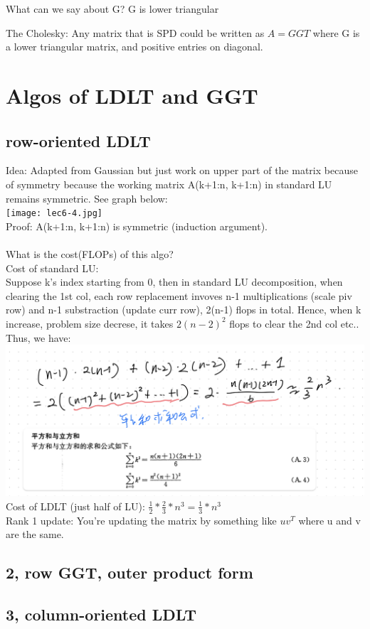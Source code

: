 \documentclass{article}
\begin{document}
\noindent
What can we say about G? G is lower triangular

\noindent
The Cholesky: Any matrix that is SPD could be written as $A = GGT$ where G is a lower triangular matrix, and positive
entries on diagonal.\\

\pagebreak
\section{Algos of LDLT and GGT}
\subsection*{row-oriented LDLT}
Idea: Adapted from Gaussian but just work on upper part of the matrix because of symmetry because
the working matrix A(k+1:n, k+1:n) in standard LU remains symmetric. See graph below:\\
\texttt{[image: lec6-4.jpg]}\\


\noindent
Proof: A(k+1:n, k+1:n) is symmetric (induction argument).\\
\\
\noindent
What is the cost(FLOPs) of this algo?\\
Cost of standard LU:\\
Suppose k's index starting from 0, then in standard LU decomposition, when clearing
the 1st col, each row replacement invoves n-1 multiplications (scale piv row) and n-1 substraction (update
curr row), 2(n-1) flops in total. Hence, when k increase, problem size decrese, it takes $2(n-2)^2$ flops
to clear the 2nd col etc.. Thus, we have:\\
\includegraphics[width=1\linewidth]{lec6-6}\\

\noindent
Cost of LDLT (just half of LU): $\frac{1}{2} * \frac{2}{3}*n^3 = \frac{1}{3}*n^3$\\


\noindent
Rank 1 update: You're updating the matrix by something like $uv^T$ where u and v are the same.\\

\noindent
\subsection*{2, row GGT, outer product form}

\noindent
\subsection*{3, column-oriented LDLT}
\end{document}
